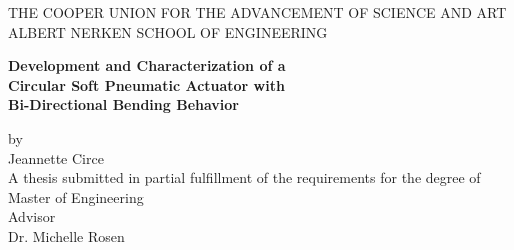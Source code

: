 \documentclass[12pt]{report}
\begin{document}
\begin{center}
\thispagestyle{empty}
\uppercase{THE COOPER UNION FOR THE ADVANCEMENT OF SCIENCE AND ART}\\[-0.9ex]
\uppercase{ALBERT NERKEN SCHOOL OF ENGINEERING}\\[-2ex]

\vspace{2cm}
\begin{center}
\textbf{\LARGE{Development and Characterization of a}} \\ 
\textbf{\LARGE{Circular Soft Pneumatic Actuator with}} \\ 
\textbf{\LARGE{Bi-Directional Bending Behavior}}
\medskip\par
\normalsize{by} \\
\Large{Jeannette Circe}\\
\vspace{4 cm}
\normalsize{A thesis submitted in partial fulfillment of the requirements for the degree of \\ Master of Engineering } \\
\vspace{3 cm}
\normalsize{Advisor}\\
\normalsize{Dr. Michelle Rosen}\\
\vspace{0.6cm}
\end{center}
\medskip
\end{center}
\clearpage
\end{document}
